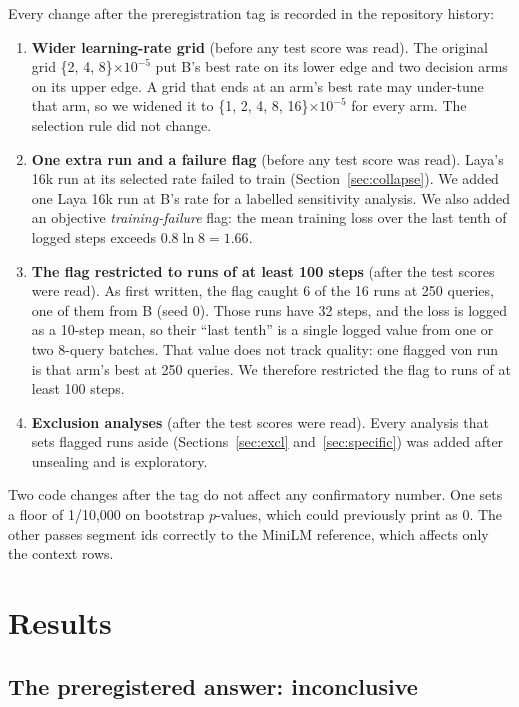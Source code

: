 \documentclass[journal]{IEEEtran}
\begin{document}
Every change after the preregistration tag is recorded in the repository history:
\begin{enumerate}
\item \textbf{Wider learning-rate grid} (before any test score was read). The original grid \{2, 4, 8\}$\times10^{-5}$ put B's best rate on its lower edge and two decision arms on its upper edge. A grid that ends at an arm's best rate may under-tune that arm, so we widened it to \{1, 2, 4, 8, 16\}$\times10^{-5}$ for every arm. The selection rule did not change.
\item \textbf{One extra run and a failure flag} (before any test score was read). Laya's 16k run at its selected rate failed to train (Section~\ref{sec:collapse}). We added one Laya 16k run at B's rate for a labelled sensitivity analysis. We also added an objective \emph{training-failure} flag: the mean training loss over the last tenth of logged steps exceeds $0.8\ln 8=1.66$.
\item \textbf{The flag restricted to runs of at least 100 steps} (after the test scores were read). As first written, the flag caught 6 of the 16 runs at 250 queries, one of them from B (seed 0). Those runs have 32 steps, and the loss is logged as a 10-step mean, so their ``last tenth'' is a single logged value from one or two 8-query batches. That value does not track quality: one flagged von run is that arm's best at 250 queries. We therefore restricted the flag to runs of at least 100 steps.
\item \textbf{Exclusion analyses} (after the test scores were read). Every analysis that sets flagged runs aside (Sections~\ref{sec:excl} and~\ref{sec:specific}) was added after unsealing and is exploratory.
\end{enumerate}
Two code changes after the tag do not affect any confirmatory number. One sets a floor of 1/10{,}000 on bootstrap $p$-values, which could previously print as 0. The other passes segment ids correctly to the MiniLM reference, which affects only the context rows.

\section{Results}

\subsection{The preregistered answer: inconclusive}
\label{sec:primary}
\end{document}
